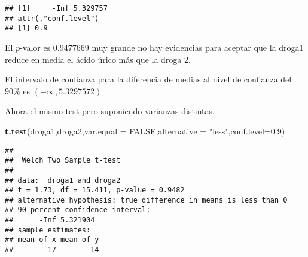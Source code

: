 \documentclass[
]{article}
\newenvironment{Shaded}{\begin{snugshade}}{\end{snugshade}}
\newcommand{\DataTypeTok}[1]{\textcolor[rgb]{0.13,0.29,0.53}{#1}}
\newcommand{\FloatTok}[1]{\textcolor[rgb]{0.00,0.00,0.81}{#1}}
\newcommand{\KeywordTok}[1]{\textcolor[rgb]{0.13,0.29,0.53}{\textbf{#1}}}
\newcommand{\NormalTok}[1]{#1}
\newcommand{\OperatorTok}[1]{\textcolor[rgb]{0.81,0.36,0.00}{\textbf{#1}}}
\newcommand{\OtherTok}[1]{\textcolor[rgb]{0.56,0.35,0.01}{#1}}
\newcommand{\StringTok}[1]{\textcolor[rgb]{0.31,0.60,0.02}{#1}}
\begin{document}
\begin{Shaded}
\end{Shaded}

\begin{verbatim}
## [1]     -Inf 5.329757
## attr(,"conf.level")
## [1] 0.9
\end{verbatim}

El \(p\)-valor es 0.9477669 muy grande no hay evidencias para aceptar
que la droga1 reduce en media el ácido úrico más que la droga 2.

El intervalo de confianza para la diferencia de medias al nivel de
confianza del \(90\%\) es \((-\infty, 5.3297572)\)

Ahora el mismo test pero suponiendo varianzas distintas.

\begin{Shaded}
\begin{Highlighting}[]
\KeywordTok{t.test}\NormalTok{(droga1,droga2,}\DataTypeTok{var.equal =} \OtherTok{FALSE}\NormalTok{,}\DataTypeTok{alternative =} \StringTok{"less"}\NormalTok{,}\DataTypeTok{conf.level=}\FloatTok{0.9}\NormalTok{)}
\end{Highlighting}
\end{Shaded}

\begin{verbatim}
## 
##  Welch Two Sample t-test
## 
## data:  droga1 and droga2
## t = 1.73, df = 15.411, p-value = 0.9482
## alternative hypothesis: true difference in means is less than 0
## 90 percent confidence interval:
##      -Inf 5.321904
## sample estimates:
## mean of x mean of y 
##        17        14
\end{verbatim}

\begin{Shaded}
\end{Shaded}
\end{document}
